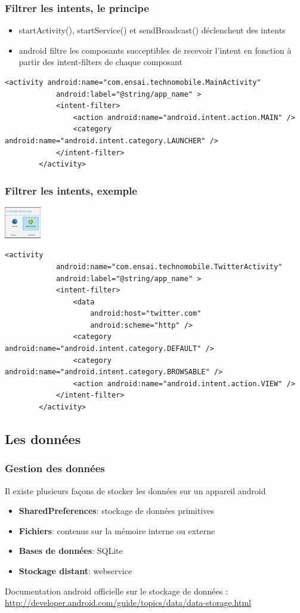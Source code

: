 \documentclass{beamer}
\begin{document}
\begin{frame}[fragile]
\frametitle{Filtrer les intents, le principe}
\begin{itemize}
    \item startActivity(), startService() et sendBroadcast() déclenchent des
    intents
	\item android filtre les composants succeptibles de recevoir l'intent en
	fonction à partir des intent-filters de chaque composant
\end{itemize}

\begin{lstlisting}
<activity android:name="com.ensai.technomobile.MainActivity"
            android:label="@string/app_name" >
            <intent-filter>
                <action android:name="android.intent.action.MAIN" />
                <category android:name="android.intent.category.LAUNCHER" />
            </intent-filter>
        </activity>
\end{lstlisting}
\end{frame}
\begin{frame}[fragile]
\frametitle{Filtrer les intents, exemple}
\includegraphics[width=45pt]{img/intentchooser.jpg}
\begin{lstlisting}
<activity
            android:name="com.ensai.technomobile.TwitterActivity"
            android:label="@string/app_name" >
            <intent-filter>
                <data
                    android:host="twitter.com"
                    android:scheme="http" />
                <category android:name="android.intent.category.DEFAULT" />
                <category android:name="android.intent.category.BROWSABLE" />
                <action android:name="android.intent.action.VIEW" />
            </intent-filter>
        </activity>
\end{lstlisting}
\end{frame}

\subsection{Les données}
\frametitle{Gestion des données}
\begin{frame}
Il existe plusieurs façons de stocker les données sur un appareil android
\begin{itemize}
    \item \textbf{SharedPreferences}: stockage de données primitives
    \item \textbf{Fichiers}: contenus sur la mémoire interne ou externe
    \item \textbf{Bases de données}: SQLite
    \item \textbf{Stockage distant}: webservice
\end{itemize}
Documentation android officielle sur le stockage de données : \url{http://developer.android.com/guide/topics/data/data-storage.html}
\end{frame}
\end{document}
